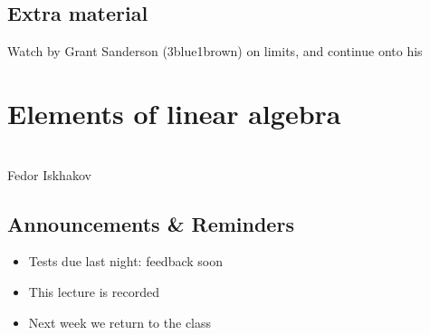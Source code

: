\documentclass[letterpaper,10pt,english]{jupyterBook}
\begin{document}
\section{Extra material}
\label{\detokenize{04.basic_analysis:extra-material}}
\sphinxAtStartPar
Watch  by Grant Sanderson (3blue1brown) on limits, and continue onto his 

\sphinxstepscope


\chapter{Elements of linear algebra}
\label{\detokenize{05.linear_algebra:elements-of-linear-algebra}}\label{\detokenize{05.linear_algebra::doc}}
\sphinxAtStartPar
{}\\
Fedor Iskhakov


\section{Announcements \& Reminders}
\label{\detokenize{05.linear_algebra:announcements-reminders}}\begin{itemize}
\item {} 
\sphinxAtStartPar
Tests due last night: feedback soon

\item {} 
\sphinxAtStartPar
This lecture is recorded

\item {} 
\sphinxAtStartPar
Next week we return to the class

\end{itemize}
\end{document}
